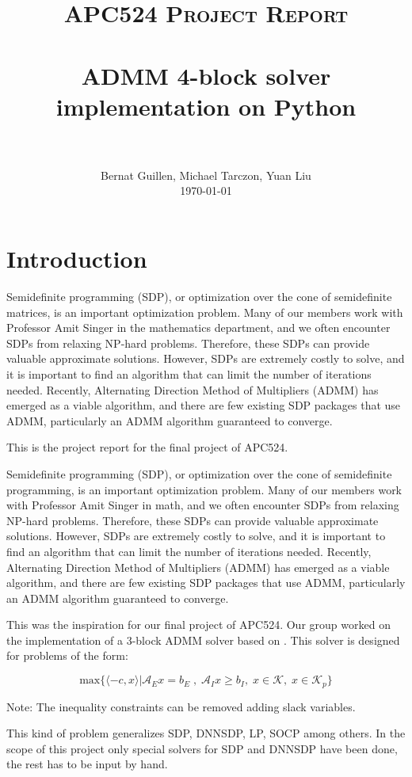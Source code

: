 \documentclass[paper=a4, fontsize=11pt]{scrartcl}
\title{
		\usefont{OT1}{bch}{b}{n}
		\normalfont \normalsize \textsc{APC524 Project Report} \\ [25pt]
		\horrule{0.5pt} \\[0.4cm]
		\huge ADMM 4-block solver implementation on Python \\
		\horrule{2pt} \\[0.5cm]
}
\author{
		\normalfont 								\normalsize
        Bernat Guillen, Michael Tarczon, Yuan Liu\\[-3pt]		\normalsize
        \today
}
\date{}
\numberwithin{equation}{section}		%
\numberwithin{figure}{section}			%
\numberwithin{table}{section}				%
\begin{document}
\maketitle
\section{Introduction}
Semidefinite programming (SDP), or optimization over the cone of semidefinite matrices, is an important optimization problem.  Many of our members work with Professor Amit Singer in the mathematics department, and we often encounter SDPs from relaxing NP-hard problems.  Therefore, these SDPs can provide valuable approximate solutions.  However, SDPs are extremely costly to solve, and it is important to find an algorithm that can limit the number of iterations needed.  Recently, Alternating Direction Method of Multipliers (ADMM) has emerged as a viable algorithm, and there are few existing SDP packages that use ADMM, particularly an ADMM algorithm guaranteed to converge.

This is the project report for the final project of APC524. 

Semidefinite programming (SDP), or optimization over the cone of semidefinite programming, is an important optimization problem.  Many of our members work with Professor Amit Singer in math, and we often encounter SDPs from relaxing NP-hard problems.  Therefore, these SDPs can provide valuable approximate solutions.  However, SDPs are extremely costly to solve, and it is important to find an algorithm that can limit the number of iterations needed.  Recently, Alternating Direction Method of Multipliers (ADMM) has emerged as a viable algorithm, and there are few existing SDP packages that use ADMM, particularly an ADMM algorithm guaranteed to converge.

This was the inspiration for our final project of APC524. Our group worked on the implementation of a 3-block ADMM solver based on \cite{sun2014}. This solver is designed for problems of the form:

\begin{equation}
\label{eqCP}
	\text{max}\{\langle -c,x\rangle | \mathcal{A}_E x = b_E\;,\;\mathcal{A}_I x\geq b_I, \;x\in \mathcal{K},\; x\in\mathcal{K}_p\}
\end{equation}

Note: The inequality constraints can be removed adding slack variables.

This kind of problem generalizes SDP, DNNSDP, LP, SOCP among others. In the scope of this project only special solvers for SDP and DNNSDP have been done, the rest has to be input by hand. 
\end{document}
